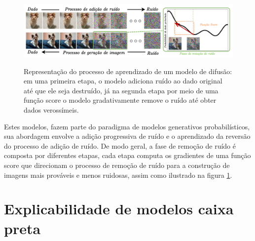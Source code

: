\begin{figure}[htbp]
	\centering
	\caption{Representação do processo de aprendizado de um modelo de difusão: em uma primeira etapa, o modelo adiciona ruído ao dado original até que ele seja destruído, já na segunda etapa por meio de uma função score o modelo gradativamente remove o ruído até obter dados verossímeis.}
		\includegraphics[scale=.28]{imagens/difussion-model.png}
	\label{fig:diffusion-model}
\end{figure}

Estes modelos, fazem parte do paradigma de modelos generativos probabilísticos, sua abordagem envolve a adição progressiva de ruído e o aprendizado da reversão do processo de adição de ruído. De modo geral, a fase de remoção de ruído é composta por diferentes etapas, cada etapa computa os gradientes de uma função score que direcionam o processo de remoção de ruído para a construção de imagens mais prováveis e menos ruidosas, assim como ilustrado na figura \ref{fig:diffusion-model}.



\section{Explicabilidade de modelos caixa preta}


